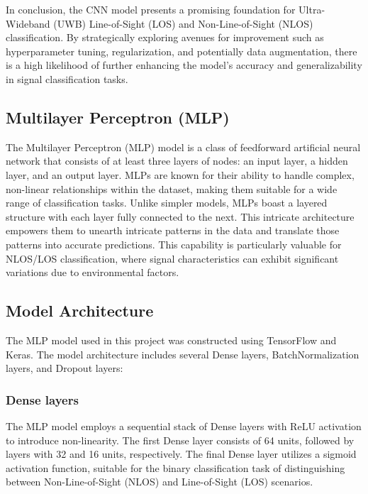In conclusion, the CNN model presents a promising foundation for Ultra-Wideband (UWB) Line-of-Sight (LOS) and Non-Line-of-Sight (NLOS) classification. By strategically exploring avenues for improvement such as hyperparameter tuning, regularization, and potentially data augmentation, there is a high likelihood of further enhancing the model's accuracy and generalizability in signal classification tasks.





\subsection{Multilayer Perceptron (MLP)}\label{mlp}                                                                                 
The Multilayer Perceptron (MLP) model is a class of feedforward artificial neural network that consists of at least three layers of nodes: an input layer, a hidden layer, and an output layer. MLPs are known for their ability to handle complex, non-linear relationships within the dataset, making them suitable for a wide range of classification tasks. Unlike simpler models, MLPs boast a layered structure with each layer fully connected to the next. This intricate architecture empowers them to unearth intricate patterns in the data and translate those patterns into accurate predictions. This capability is particularly valuable for NLOS/LOS classification, where signal characteristics can exhibit significant variations due to environmental factors.

\subsection{Model Architecture}

The MLP model used in this project was constructed using TensorFlow and Keras. The model architecture includes several Dense layers, BatchNormalization layers, and Dropout layers:

\subsubsection{Dense layers}

The MLP model employs a sequential stack of Dense layers with ReLU activation to introduce non-linearity. The first Dense layer consists of 64 units, followed by layers with 32 and 16 units, respectively. The final Dense layer utilizes a sigmoid activation function, suitable for the binary classification task of distinguishing between Non-Line-of-Sight (NLOS) and Line-of-Sight (LOS) scenarios.

